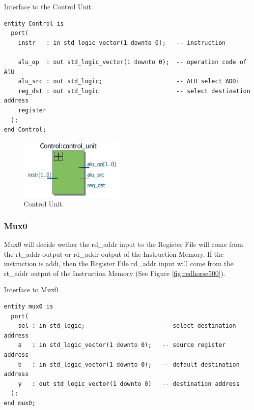 \documentclass[a4paper, 11pt,oneside]{article}
\begin{document}
\begin{listing}[H]
\caption{Interface to the Control Unit.}
\label{code:control}
\begin{verbatim}
entity Control is
  port(
    instr   : in std_logic_vector(1 downto 0);   -- instruction

    alu_op  : out std_logic_vector(1 downto 0);  -- operation code of AlU
    alu_src : out std_logic;                     -- ALU select ADDi
    reg_dst : out std_logic                      -- select destination address 
    register
  );
end Control;
\end{verbatim}
\end{listing}

\begin{figure}[H]
	\begin{center}
	\includegraphics[width=2in]{control_unit.png}
	\caption{Control Unit.}
	\label{fig:cu} 
	\end{center}
\end{figure}

\subsubsection{Mux0}
Mux0 will decide wether the rd\_addr input to the Register File will come from 
the rt\_addr output or rd\_addr output of the Instruction Memory. If the 
instruction is addi, then the Register File rd\_addr input will come from the 
rt\_addr output of the Instruction Memory (See Figure \ref{fig:redhorse500}).

\begin{listing}[H]
\caption{Interface to Mux0.}
\label{code:mux0}
\begin{verbatim}
entity mux0 is
  port(
    sel : in std_logic;                      -- select destination address
    a   : in std_logic_vector(1 downto 0);   -- source register address
    b   : in std_logic_vector(1 downto 0);   -- default destination address
    y   : out std_logic_vector(1 downto 0)   -- destination address
  );
end mux0;
\end{verbatim}
\end{listing}
\end{document}
